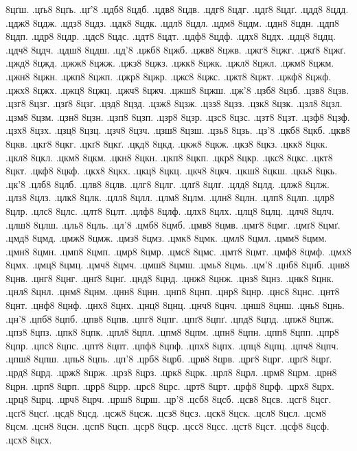 {8цґш.
.цґь8
8цґь.
.цґ'8
.цдб8
8цдб.
.цдв8
8цдв.
.цдг8
8цдг.
.цдґ8
8цдґ.
.цдд8
8цдд.
.цдж8
8цдж.
.цдз8
8цдз.
.цдк8
8цдк.
.цдл8
8цдл.
.цдм8
8цдм.
.цдн8
8цдн.
.цдп8
8цдп.
.цдр8
8цдр.
.цдс8
8цдс.
.цдт8
8цдт.
.цдф8
8цдф.
.цдх8
8цдх.
.цдц8
8цдц.
.цдч8
8цдч.
.цдш8
8цдш.
.цд'8
.цжб8
8цжб.
.цжв8
8цжв.
.цжг8
8цжг.
.цжґ8
8цжґ.
.цжд8
8цжд.
.цжж8
8цжж.
.цжз8
8цжз.
.цжк8
8цжк.
.цжл8
8цжл.
.цжм8
8цжм.
.цжн8
8цжн.
.цжп8
8цжп.
.цжр8
8цжр.
.цжс8
8цжс.
.цжт8
8цжт.
.цжф8
8цжф.
.цжх8
8цжх.
.цжц8
8цжц.
.цжч8
8цжч.
.цжш8
8цжш.
.цж'8
.цзб8
8цзб.
.цзв8
8цзв.
.цзг8
8цзг.
.цзґ8
8цзґ.
.цзд8
8цзд.
.цзж8
8цзж.
.цзз8
8цзз.
.цзк8
8цзк.
.цзл8
8цзл.
.цзм8
8цзм.
.цзн8
8цзн.
.цзп8
8цзп.
.цзр8
8цзр.
.цзс8
8цзс.
.цзт8
8цзт.
.цзф8
8цзф.
.цзх8
8цзх.
.цзц8
8цзц.
.цзч8
8цзч.
.цзш8
8цзш.
.цзь8
8цзь.
.цз'8
.цкб8
8цкб.
.цкв8
8цкв.
.цкг8
8цкг.
.цкґ8
8цкґ.
.цкд8
8цкд.
.цкж8
8цкж.
.цкз8
8цкз.
.цкк8
8цкк.
.цкл8
8цкл.
.цкм8
8цкм.
.цкн8
8цкн.
.цкп8
8цкп.
.цкр8
8цкр.
.цкс8
8цкс.
.цкт8
8цкт.
.цкф8
8цкф.
.цкх8
8цкх.
.цкц8
8цкц.
.цкч8
8цкч.
.цкш8
8цкш.
.цкь8
8цкь.
.цк'8
.цлб8
8цлб.
.цлв8
8цлв.
.цлг8
8цлг.
.цлґ8
8цлґ.
.цлд8
8цлд.
.цлж8
8цлж.
.цлз8
8цлз.
.цлк8
8цлк.
.цлл8
8цлл.
.цлм8
8цлм.
.цлн8
8цлн.
.цлп8
8цлп.
.цлр8
8цлр.
.цлс8
8цлс.
.цлт8
8цлт.
.цлф8
8цлф.
.цлх8
8цлх.
.цлц8
8цлц.
.цлч8
8цлч.
.цлш8
8цлш.
.цль8
8цль.
.цл'8
.цмб8
8цмб.
.цмв8
8цмв.
.цмг8
8цмг.
.цмґ8
8цмґ.
.цмд8
8цмд.
.цмж8
8цмж.
.цмз8
8цмз.
.цмк8
8цмк.
.цмл8
8цмл.
.цмм8
8цмм.
.цмн8
8цмн.
.цмп8
8цмп.
.цмр8
8цмр.
.цмс8
8цмс.
.цмт8
8цмт.
.цмф8
8цмф.
.цмх8
8цмх.
.цмц8
8цмц.
.цмч8
8цмч.
.цмш8
8цмш.
.цмь8
8цмь.
.цм'8
.цнб8
8цнб.
.цнв8
8цнв.
.цнг8
8цнг.
.цнґ8
8цнґ.
.цнд8
8цнд.
.цнж8
8цнж.
.цнз8
8цнз.
.цнк8
8цнк.
.цнл8
8цнл.
.цнм8
8цнм.
.цнн8
8цнн.
.цнп8
8цнп.
.цнр8
8цнр.
.цнс8
8цнс.
.цнт8
8цнт.
.цнф8
8цнф.
.цнх8
8цнх.
.цнц8
8цнц.
.цнч8
8цнч.
.цнш8
8цнш.
.цнь8
8цнь.
.цн'8
.цпб8
8цпб.
.цпв8
8цпв.
.цпг8
8цпг.
.цпґ8
8цпґ.
.цпд8
8цпд.
.цпж8
8цпж.
.цпз8
8цпз.
.цпк8
8цпк.
.цпл8
8цпл.
.цпм8
8цпм.
.цпн8
8цпн.
.цпп8
8цпп.
.цпр8
8цпр.
.цпс8
8цпс.
.цпт8
8цпт.
.цпф8
8цпф.
.цпх8
8цпх.
.цпц8
8цпц.
.цпч8
8цпч.
.цпш8
8цпш.
.цпь8
8цпь.
.цп'8
.црб8
8црб.
.црв8
8црв.
.црг8
8црг.
.црґ8
8црґ.
.црд8
8црд.
.црж8
8црж.
.црз8
8црз.
.црк8
8црк.
.црл8
8црл.
.црм8
8црм.
.црн8
8црн.
.црп8
8црп.
.црр8
8црр.
.црс8
8црс.
.црт8
8црт.
.црф8
8црф.
.црх8
8црх.
.црц8
8црц.
.црч8
8црч.
.црш8
8црш.
.цр'8
.цсб8
8цсб.
.цсв8
8цсв.
.цсг8
8цсг.
.цсґ8
8цсґ.
.цсд8
8цсд.
.цсж8
8цсж.
.цсз8
8цсз.
.цск8
8цск.
.цсл8
8цсл.
.цсм8
8цсм.
.цсн8
8цсн.
.цсп8
8цсп.
.цср8
8цср.
.цсс8
8цсс.
.цст8
8цст.
.цсф8
8цсф.
.цсх8
8цсх.
}
